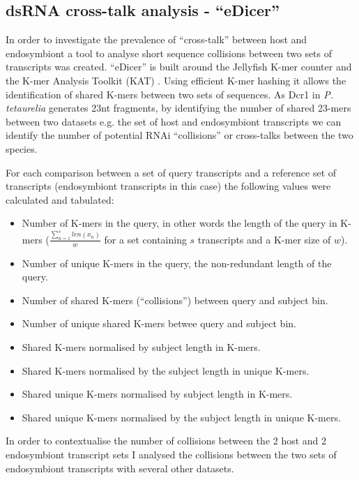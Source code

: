 \subsection{dsRNA cross-talk analysis - ``eDicer''}

In order to investigate the prevalence of ``cross-talk'' between 
host and endosymbiont a tool to analyse short sequence collisions between two sets
of transcripts was created.  ``eDicer'' is built around 
the Jellyfish K-mer counter \citep{Marcais2011} 
and the K-mer Analysis Toolkit (KAT) \citep{ClavijoKAT}.  Using efficient
K-mer hashing it allows the identification of shared K-mers between
two sets of sequences.  As Dcr1 in \textit{P. tetaurelia} generates
23nt fragments, by identifying the number of shared 23-mers between
two datasets e.g. the set of host and endosymbiont transcripts 
we can identify the number of potential RNAi ``collisions'' or cross-talks
between the two species. 

For each comparison between a set of query transcripts and a reference
set of transcripts (endosymbiont transcripts in this case)
the following
values were calculated and tabulated:
\begin{itemize}
    \item Number of K-mers in the query, in other words the length of the query
        in K-mers (\(\frac{\sum^s_{n=1} len(x_{n})}{w}\)
        for a set containing \(s\) transcripts and a K-mer size of \(w\)).
    \item Number of unique K-mers in the query, the non-redundant length of 
        the query.
    \item Number of shared  K-mers (``collisions'') between query and subject bin.
    \item Number of unique shared K-mers betwee query and subject bin.
    \item Shared K-mers normalised by subject length in K-mers.
    \item Shared K-mers normalised by the subject length in unique K-mers.
    \item Shared unique K-mers normalised by subject length in K-mers.
    \item Shared unique K-mers normalised by the subject length in unique K-mers.
\end{itemize}

In order to contextualise the number of collisions between the 2
host and 2 endosymbiont transcript sets
I analysed the collisions between the two sets of endosymbiont transcripts 
with several other datasets.  

